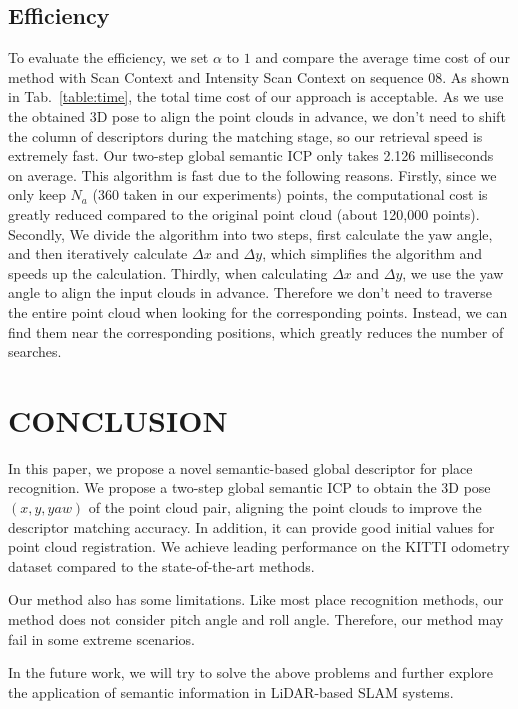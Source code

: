 \documentclass[letterpaper, 10 pt, conference]{ieeeconf}  %
\begin{document}
\subsection{Efficiency}
To evaluate the efficiency, we set $\alpha$ to $1$ and compare the average time cost of our method with Scan Context and Intensity Scan Context on sequence 08. As shown in Tab.~\ref{table:time}, the total time cost of our approach is acceptable. As we use the obtained 3D pose to align the point clouds in advance, we don't need to shift the column of descriptors during the matching stage, so our retrieval speed is extremely fast. Our two-step global semantic ICP only takes 2.126 milliseconds on average. This algorithm is fast due to the following reasons. Firstly, since we only keep \(N_a\) (360 taken in our experiments) points, the computational cost is greatly reduced compared to the original point cloud (about 120,000 points). Secondly, We divide the algorithm into two steps, first calculate the yaw angle, and then iteratively calculate $\Delta x$ and $\Delta y$, which simplifies the algorithm and speeds up the calculation. Thirdly, when calculating $\Delta x$ and $\Delta y$, we use the yaw angle to align the input clouds in advance. Therefore we don’t need to traverse the entire point cloud when looking for the corresponding points. Instead, we can find them near the corresponding positions, which greatly reduces the number of searches.


\section{CONCLUSION}
In this paper, we propose a novel semantic-based global descriptor for place recognition. We propose a two-step global semantic ICP to obtain the 3D pose \((x,y,yaw)\) of the point cloud pair, aligning the point clouds to improve the descriptor matching accuracy. In addition, it can provide good initial values for point cloud registration. We achieve leading performance on the KITTI odometry dataset compared to the state-of-the-art methods. 

Our method also has some limitations. Like most place recognition methods, our method does not consider pitch angle and roll angle. Therefore, our method may fail in some extreme scenarios.

In the future work, we will try to solve the above problems and further explore the application of semantic information in LiDAR-based SLAM systems.








\end{document}
